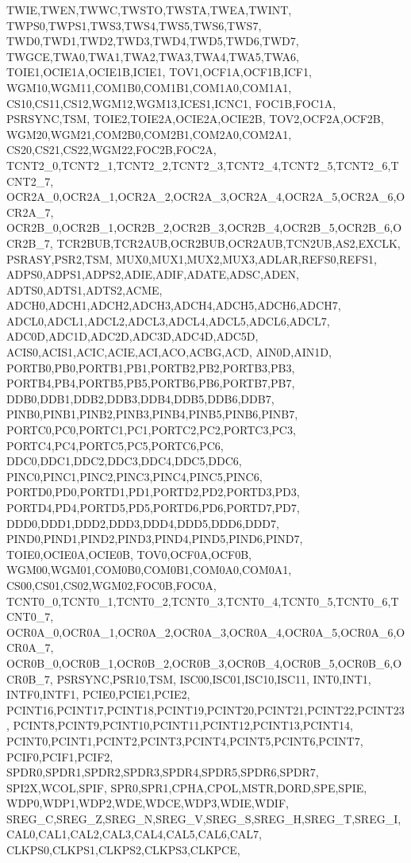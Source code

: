 {{				TWIE,TWEN,TWWC,TWSTO,TWSTA,TWEA,TWINT,
				TWPS0,TWPS1,TWS3,TWS4,TWS5,TWS6,TWS7,
				TWD0,TWD1,TWD2,TWD3,TWD4,TWD5,TWD6,TWD7,
				TWGCE,TWA0,TWA1,TWA2,TWA3,TWA4,TWA5,TWA6,
				TOIE1,OCIE1A,OCIE1B,ICIE1,
				TOV1,OCF1A,OCF1B,ICF1,
				WGM10,WGM11,COM1B0,COM1B1,COM1A0,COM1A1,
				CS10,CS11,CS12,WGM12,WGM13,ICES1,ICNC1,
				FOC1B,FOC1A,
				PSRSYNC,TSM,
				TOIE2,TOIE2A,OCIE2A,OCIE2B,
				TOV2,OCF2A,OCF2B,
				WGM20,WGM21,COM2B0,COM2B1,COM2A0,COM2A1,
				CS20,CS21,CS22,WGM22,FOC2B,FOC2A,
				TCNT2_0,TCNT2_1,TCNT2_2,TCNT2_3,TCNT2_4,TCNT2_5,TCNT2_6,TCNT2_7,
				OCR2A_0,OCR2A_1,OCR2A_2,OCR2A_3,OCR2A_4,OCR2A_5,OCR2A_6,OCR2A_7,
				OCR2B_0,OCR2B_1,OCR2B_2,OCR2B_3,OCR2B_4,OCR2B_5,OCR2B_6,OCR2B_7,
				TCR2BUB,TCR2AUB,OCR2BUB,OCR2AUB,TCN2UB,AS2,EXCLK,
				PSRASY,PSR2,TSM,
				MUX0,MUX1,MUX2,MUX3,ADLAR,REFS0,REFS1,
				ADPS0,ADPS1,ADPS2,ADIE,ADIF,ADATE,ADSC,ADEN,
				ADTS0,ADTS1,ADTS2,ACME,
				ADCH0,ADCH1,ADCH2,ADCH3,ADCH4,ADCH5,ADCH6,ADCH7,
				ADCL0,ADCL1,ADCL2,ADCL3,ADCL4,ADCL5,ADCL6,ADCL7,
				ADC0D,ADC1D,ADC2D,ADC3D,ADC4D,ADC5D,
				ACIS0,ACIS1,ACIC,ACIE,ACI,ACO,ACBG,ACD,
				AIN0D,AIN1D,
				PORTB0,PB0,PORTB1,PB1,PORTB2,PB2,PORTB3,PB3,
				PORTB4,PB4,PORTB5,PB5,PORTB6,PB6,PORTB7,PB7,
				DDB0,DDB1,DDB2,DDB3,DDB4,DDB5,DDB6,DDB7,
				PINB0,PINB1,PINB2,PINB3,PINB4,PINB5,PINB6,PINB7,
				PORTC0,PC0,PORTC1,PC1,PORTC2,PC2,PORTC3,PC3,
				PORTC4,PC4,PORTC5,PC5,PORTC6,PC6,
				DDC0,DDC1,DDC2,DDC3,DDC4,DDC5,DDC6,
				PINC0,PINC1,PINC2,PINC3,PINC4,PINC5,PINC6,
				PORTD0,PD0,PORTD1,PD1,PORTD2,PD2,PORTD3,PD3,
				PORTD4,PD4,PORTD5,PD5,PORTD6,PD6,PORTD7,PD7,
				DDD0,DDD1,DDD2,DDD3,DDD4,DDD5,DDD6,DDD7,
				PIND0,PIND1,PIND2,PIND3,PIND4,PIND5,PIND6,PIND7,
				TOIE0,OCIE0A,OCIE0B,
				TOV0,OCF0A,OCF0B,
				WGM00,WGM01,COM0B0,COM0B1,COM0A0,COM0A1,
				CS00,CS01,CS02,WGM02,FOC0B,FOC0A,
				TCNT0_0,TCNT0_1,TCNT0_2,TCNT0_3,TCNT0_4,TCNT0_5,TCNT0_6,TCNT0_7,
				OCR0A_0,OCR0A_1,OCR0A_2,OCR0A_3,OCR0A_4,OCR0A_5,OCR0A_6,OCR0A_7,
				OCR0B_0,OCR0B_1,OCR0B_2,OCR0B_3,OCR0B_4,OCR0B_5,OCR0B_6,OCR0B_7,
				PSRSYNC,PSR10,TSM,
				ISC00,ISC01,ISC10,ISC11,
				INT0,INT1,
				INTF0,INTF1,
				PCIE0,PCIE1,PCIE2,
				PCINT16,PCINT17,PCINT18,PCINT19,PCINT20,PCINT21,PCINT22,PCINT23,
				PCINT8,PCINT9,PCINT10,PCINT11,PCINT12,PCINT13,PCINT14,
				PCINT0,PCINT1,PCINT2,PCINT3,PCINT4,PCINT5,PCINT6,PCINT7,
				PCIF0,PCIF1,PCIF2,
				SPDR0,SPDR1,SPDR2,SPDR3,SPDR4,SPDR5,SPDR6,SPDR7,
				SPI2X,WCOL,SPIF,
				SPR0,SPR1,CPHA,CPOL,MSTR,DORD,SPE,SPIE,
				WDP0,WDP1,WDP2,WDE,WDCE,WDP3,WDIE,WDIF,
				SREG_C,SREG_Z,SREG_N,SREG_V,SREG_S,SREG_H,SREG_T,SREG_I,
				CAL0,CAL1,CAL2,CAL3,CAL4,CAL5,CAL6,CAL7,
				CLKPS0,CLKPS1,CLKPS2,CLKPS3,CLKPCE,
}}
